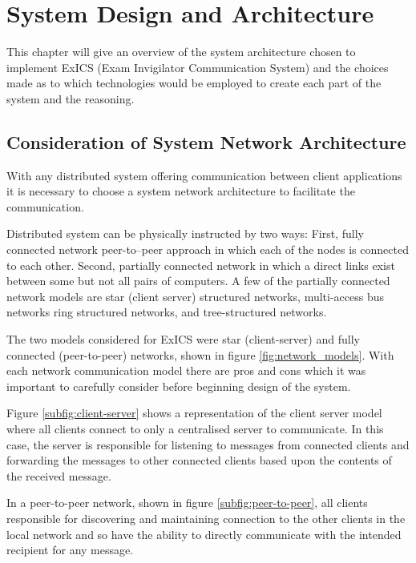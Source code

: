 \chapter{System Design and Architecture}

\label{ch:systemarchitecture}

This chapter will give an overview of the system architecture chosen to implement ExICS (Exam Invigilator Communication System) and the choices made as to which technologies would be employed to create each part of the system and the reasoning.

\section{Consideration of System Network Architecture}

\FloatBarrier

With any distributed system offering communication between client applications it is necessary to choose a system network architecture to facilitate the communication.

Distributed system can be physically instructed by two ways: First, fully connected network peer-to–peer approach in which each of the nodes is connected to each other. Second, partially connected network in which a direct links exist between some but not all pairs of computers. A few of the partially connected network models are star (client server) structured networks, multi-access bus networks ring structured networks, and tree-structured networks.\cite{designingChatRoomApp}

The two models considered for ExICS were star (client-server) and fully connected (peer-to-peer) networks, shown in figure \ref{fig:network_models}.  With each network communication model there are pros and cons which it was important to carefully consider before beginning design of the system.

Figure \ref{subfig:client-server} shows a representation of the client server model where all clients connect to only a centralised server to communicate.  In this case, the server is responsible for listening to messages from connected clients and forwarding the messages to other connected clients based upon the contents of the received message.

In a peer-to-peer network, shown in figure \ref{subfig:peer-to-peer}, all clients responsible for discovering and maintaining connection to the other clients in the local network and so have the ability to directly communicate with the intended recipient for any message.

